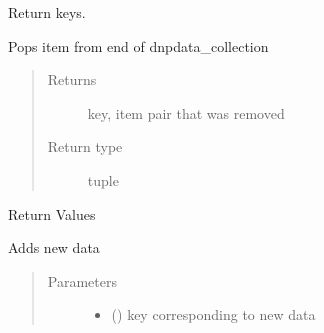 \documentclass[letterpaper,10pt,english]{sphinxmanual}
\begin{document}
\begin{fulllineitems}
\begin{fulllineitems}
\end{fulllineitems}


\begin{fulllineitems}
\label{\detokenize{dnpData:dnpLab.dnpdata_collection.keys}}
Return keys.

\end{fulllineitems}


\begin{fulllineitems}
\label{\detokenize{dnpData:dnpLab.dnpdata_collection.popitem}}
Pops item from end of dnpdata\_collection
\begin{quote}\begin{description}
\item[{Returns}] \leavevmode
key, item pair that was removed

\item[{Return type}] \leavevmode
tuple

\end{description}\end{quote}

\end{fulllineitems}


\begin{fulllineitems}
\label{\detokenize{dnpData:dnpLab.dnpdata_collection.values}}
Return Values

\end{fulllineitems}


\begin{fulllineitems}
\label{\detokenize{dnpData:dnpLab.dnpdata_collection.add}}
Adds new data
\begin{quote}\begin{description}
\item[{Parameters}] \leavevmode\begin{itemize}
\item {} 
 () \sphinxhyphen{}\sphinxhyphen{} key corresponding to new data


\end{itemize}
\end{description}
\end{quote}
\end{fulllineitems}
\end{fulllineitems}
\end{document}
